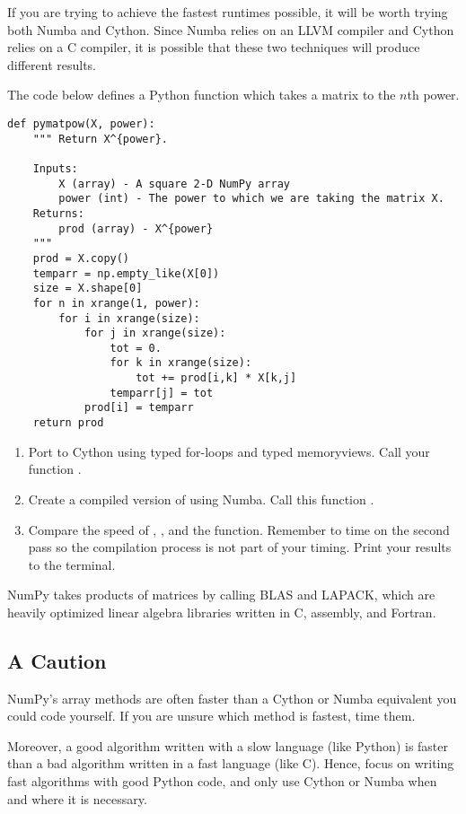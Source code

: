 If you are trying to achieve the fastest runtimes possible, it will be worth trying both Numba and Cython. Since Numba relies on an LLVM compiler and Cython relies on a C compiler, it is possible that these two techniques will produce different results.

\begin{problem}
The code below defines a Python function which takes a matrix to the $n$th power.
\begin{lstlisting}
def pymatpow(X, power):
    """ Return X^{power}.

    Inputs:
        X (array) - A square 2-D NumPy array
        power (int) - The power to which we are taking the matrix X.
    Returns:
        prod (array) - X^{power}
    """
    prod = X.copy()
    temparr = np.empty_like(X[0])
    size = X.shape[0]
    for n in xrange(1, power):
        for i in xrange(size):
            for j in xrange(size):
                tot = 0.
                for k in xrange(size):
                    tot += prod[i,k] * X[k,j]
                temparr[j] = tot
            prod[i] = temparr
    return prod
\end{lstlisting}

\begin{enumerate}
\item Port  to Cython using typed for-loops and typed memoryviews. Call your function .
\item Create a compiled version of  using Numba. Call this function .
\item Compare the speed of , ,  and the  function. Remember to time  on the second pass so the compilation process is not part of your timing. Print your results to the terminal.
\end{enumerate}
NumPy takes products of matrices by calling BLAS and LAPACK, which are heavily optimized linear algebra libraries written in C, assembly, and Fortran.
\end{problem}

\subsection*{A Caution}
NumPy's array methods are often faster than a Cython or Numba equivalent you could code yourself.
If you are unsure which method is fastest, time them.

Moreover, a good algorithm written with a slow language (like Python) is faster than a bad algorithm written in a fast language (like C).
Hence, focus on writing fast algorithms with good Python code, and only use Cython  or Numba when and where it is necessary.

